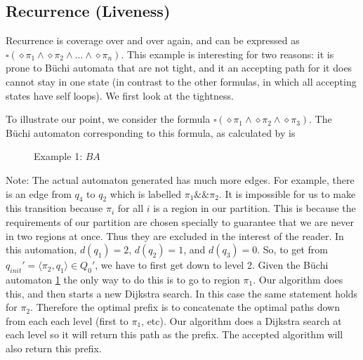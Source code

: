 \subsection{Recurrence (Liveness)}
Recurrence is coverage over and over again, and can be expressed as $\square(\diamond \pi_1 \land \diamond \pi_2 \land \dots \land \diamond \pi_n)$. This example is interesting for two reasons: it is prone to B\"{u}chi automata that are not tight, and it an accepting path for it does cannot stay in one state (in contrast to the other formulas, in which all accepting states have self loops). We first look at the tightness.

To illustrate our point, we consider the formula $\square(\diamond \pi_1 \land \diamond \pi_2 \land \diamond \pi_3)$. The B\"{u}chi automaton corresponding to this formula, as calculated by \cite{gastin01} is 

\begin{figure}
\centering
{}
\caption{Example 1: $BA$}
\label{fig:gasBuchiRec}
\end{figure}
Note: The actual automaton generated has much more edges. For example, there is an edge from $q_4$ to $q_2$ which is labelled $\pi_1 \&\& \pi_2$. It is impossible for us to make this transition because $\pi_i$ for all $i$ is a region in our partition. This is because the requirements of our partition are chosen specially to guarantee that we are never in two regions at once. Thus they are excluded in the interest of the reader. In this automation, $d(q_1)=2$, $d(q_2)=1$, and $d(q_3)=0$. So, to get from $q_{init}' = \langle \pi_2, q_1 \rangle \in Q_0'$, we have to first get down to level 2. Given the B\"{u}chi automaton \ref{fig:gasBuchiRec} the only way to do this is to go to region $\pi_1$. Our algorithm does this, and then starts a new Dijkstra search. In this case the same statement holds for $\pi_2$. Therefore the optimal prefix is to concatenate the optimal paths down from each each level (first to $\pi_1$, etc). Our algorithm does a Dijkstra search at each level so it will return this path as the prefix. The accepted algorithm will also return this prefix. 

